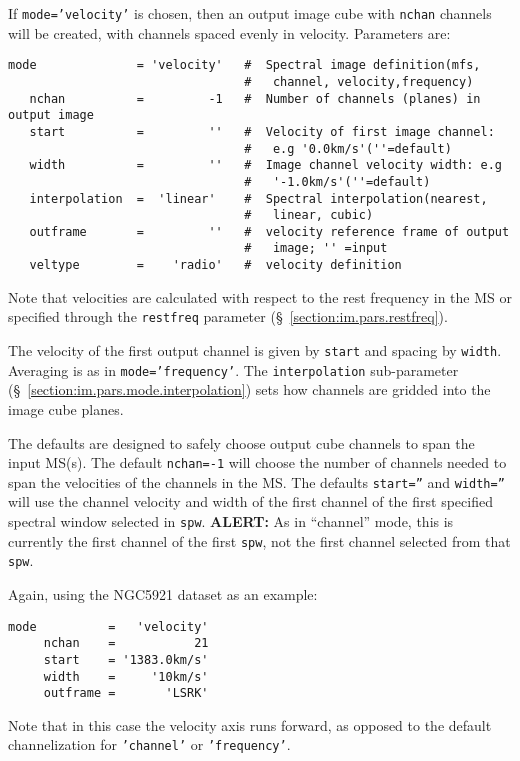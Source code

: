 If {\tt mode='velocity'} is chosen, then an output image cube
with {\tt nchan} channels will be created, with channels spaced
evenly in velocity.  Parameters are:
\small
\begin{verbatim}
mode              = 'velocity'   #  Spectral image definition(mfs,
                                 #   channel, velocity,frequency)
   nchan          =         -1   #  Number of channels (planes) in output image
   start          =         ''   #  Velocity of first image channel:
                                 #   e.g '0.0km/s'(''=default)
   width          =         ''   #  Image channel velocity width: e.g
                                 #   '-1.0km/s'(''=default)
   interpolation  =  'linear'    #  Spectral interpolation(nearest,
                                 #   linear, cubic)
   outframe       =         ''   #  velocity reference frame of output
                                 #   image; '' =input
   veltype        =    'radio'   #  velocity definition
\end{verbatim}
\normalsize
Note that velocities are calculated with respect to the rest frequency
in the MS or specified through the {\tt restfreq} parameter
(\S~\ref{section:im.pars.restfreq}).

The velocity of the first output channel is given by {\tt start}
and spacing by {\tt width}.  Averaging is as in
{\tt mode='frequency'}.  The {\tt interpolation} sub-parameter
(\S~\ref{section:im.pars.mode.interpolation}) sets how channels are
gridded into the image cube planes.

The defaults are designed to safely choose output cube channels to
span the input MS(s).
The default {\tt nchan=-1} will choose the number of channels needed
to span the velocities of the channels in the MS.  
The defaults {\tt start=''} and {\tt width=''} will use the channel
velocity and width of the first channel of the first specified
spectral window selected in {\tt spw}.  {\bf ALERT:} As in ``channel''
mode, this is currently the first channel of the first {\tt spw}, not
the first channel selected from that {\tt spw}.  

Again, using the NGC5921 dataset as an example:
\small
\begin{verbatim}
mode          =   'velocity'        
     nchan    =           21        
     start    = '1383.0km/s'      
     width    =     '10km/s'        
     outframe =       'LSRK'
\end{verbatim}
\normalsize
Note that in this case the velocity axis runs forward, as opposed to
the default channelization for {\tt 'channel'} or {\tt 'frequency'}.

